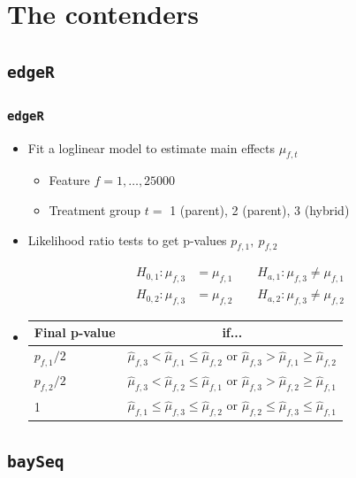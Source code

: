 \documentclass[handout]{beamer}
\providecommand{\wh}[1]{\widehat{#1}}
\numberwithin{equation}{section}
\begin{document}
\section{The contenders}

\subsection{{\tt edgeR}}

\begin{frame}
\frametitle{{\tt edgeR}}

\begin{itemize}
\item Fit a loglinear model to estimate main effects $\mu_{f, t}$
\begin{itemize}
\item Feature $f = 1, \ldots, 25000$
\item Treatment group $t = $ 1 (parent), 2 (parent), 3 (hybrid)
\end{itemize}
\pause \item Likelihood ratio tests to get p-values $p_{f, 1}, \ p_{f, 2}$

\begin{align*}
H_{0, 1}: \mu_{f, 3} &= \mu_{f, 1} \qquad H_{a, 1}: \mu_{f, 3} \ne \mu_{f, 1} \\
H_{0, 2}: \mu_{f, 3} &= \mu_{f, 2} \qquad H_{a, 2}: \mu_{f, 3} \ne \mu_{f, 2}
\end{align*}


\pause \item 
\begin{center}
\begin{tabular}{l|c}
Final p-value & if... \\ \hline
$p_{f, 1}/2$ & $\wh{\mu}_{f, 3} < \wh{\mu}_{f, 1} \le \wh{\mu}_{f, 2}$ or $\wh{\mu}_{f, 3} > \wh{\mu}_{f, 1} \ge \wh{\mu}_{f, 2}$ \\
$p_{f, 2}/2$ & $\wh{\mu}_{f, 3} < \wh{\mu}_{f, 2} \le \wh{\mu}_{f, 1}$ or $\wh{\mu}_{f, 3} > \wh{\mu}_{f, 2} \ge \wh{\mu}_{f, 1}$ \\
1 & $\wh{\mu}_{f, 1} \le \wh{\mu}_{f, 3} \le \wh{\mu}_{f, 2}$ or $\wh{\mu}_{f, 2} \le \wh{\mu}_{f, 3} \le \wh{\mu}_{f, 1}$
\end{tabular}
\end{center}

\end{itemize}
\end{frame}


\subsection{{\tt baySeq}}
\end{document}
